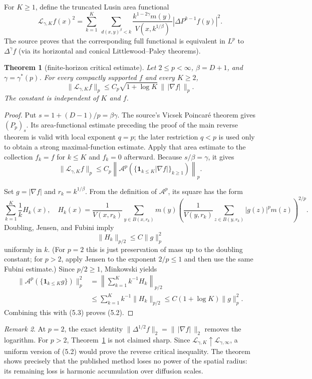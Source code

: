 \documentclass[11pt]{article}
\newtheorem{theorem}{Theorem}
\theoremstyle{remark}
\newtheorem{remark}[theorem]{Remark}
\newcommand{\cL}{\mathcal L}
\begin{document}
For $K\geq1$, define the truncated Lusin area functional
\[
 \cL_{\gamma,K}f(x)^2=
 \sum_{k=1}^K\ \sum_{d(x,y)^\beta<k}
 \frac{k^{1-2\gamma}m(y)}{V(x,k^{1/\beta})}
 |\Delta P^{k-1}f(y)|^2.
 \tag{5.1}
\]
The source proves that the corresponding full functional is equivalent in
$L^p$ to $\Delta^\gamma f$ (via its horizontal and conical Littlewood--Paley
theorems).

\begin{theorem}[finite-horizon critical estimate]\label{thm:log}
Let $2\leq p<\infty$, $\beta=D+1$, and
$\gamma=\gamma^*(p)$.  For every compactly supported $f$ and every $K\geq2$,
\[
 \|\cL_{\gamma,K}f\|_p
 \leq C_p\sqrt{1+\log K}\,\|\,|\nabla f|\,\|_p.
 \tag{5.2}
\]
The constant is independent of $K$ and $f$.
\end{theorem}

\begin{proof}
Put $s=1+(D-1)/p=\beta\gamma$.  The source's Vicsek Poincar\'e theorem gives
$(P_p)_s$.  Its area-functional estimate preceding the proof of the main
reverse theorem is valid with local exponent $q=p$; the later restriction
$q<p$ is used only to obtain a strong maximal-function estimate.  Apply that
area estimate to the collection $f_k=f$ for $k\leq K$ and $f_k=0$ afterward.
Because $s/\beta=\gamma$, it gives
\[
 \|\cL_{\gamma,K}f\|_p
 \leq C_p\left\|\mathcal A^p
  (\{\mathbf1_{k\leq K}|\nabla f|\}_{k\geq1})\right\|_p.
 \tag{5.3}
\]

Set $g=|\nabla f|$ and $r_k=k^{1/\beta}$.  From the definition of
$\mathcal A^p$, its square has the form
\[
 \sum_{k=1}^K\frac1k H_k(x),
\quad
 H_k(x)=\frac1{V(x,r_k)}\sum_{y\in B(x,r_k)}m(y)
 \left(\frac1{V(y,r_k)}\sum_{z\in B(y,r_k)}|g(z)|^p m(z)
 \right)^{2/p}.
 \tag{5.4}
\]
Doubling, Jensen, and Fubini imply
\[
 \|H_k\|_{p/2}\leq C\|g\|_p^2
 \tag{5.5}
\]
uniformly in $k$.  (For $p=2$ this is just preservation of mass up to the
doubling constant; for $p>2$, apply Jensen to the exponent $2/p\leq1$ and
then use the same Fubini estimate.)  Since $p/2\geq1$, Minkowski yields
\begin{align*}
 \|\mathcal A^p(\{\mathbf1_{k\leq K}g\})\|_p^2
 &=\left\|\sum_{k=1}^K k^{-1}H_k\right\|_{p/2}\\
 &\leq\sum_{k=1}^K k^{-1}\|H_k\|_{p/2}
 \leq C(1+\log K)\|g\|_p^2.
\end{align*}
Combining this with (5.3) proves (5.2).
\end{proof}

\begin{remark}
At $p=2$, the exact identity
$\|\Delta^{1/2}f\|_2=\|\,|\nabla f|\,\|_2$ removes the logarithm.  For
$p>2$, Theorem~\ref{thm:log} is not claimed sharp.  Since
$\cL_{\gamma,K}\uparrow\cL_{\gamma,\infty}$, a uniform version of (5.2)
would prove the reverse critical inequality.  The theorem shows precisely
that the published method loses no power of the spatial radius: its remaining
loss is harmonic accumulation over diffusion scales.
\end{remark}
\end{document}
